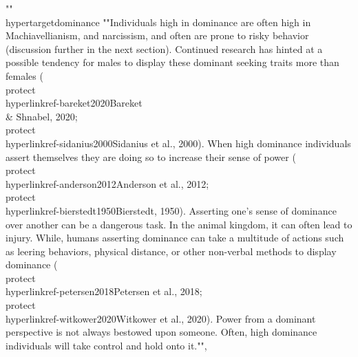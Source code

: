 {{{{""\\hypertarget{dominance}{%
""Individuals high in dominance are often high in Machiavellianism, and narcissism, and often are prone to risky behavior (discussion further in the next section). Continued research has hinted at a possible tendency for males to display these dominant seeking traits more than females (\\protect\\hyperlink{ref-bareket2020}{Bareket \\& Shnabel, 2020}; \\protect\\hyperlink{ref-sidanius2000}{Sidanius et al., 2000}). When high dominance individuals assert themselves they are doing so to increase their sense of power (\\protect\\hyperlink{ref-anderson2012}{Anderson et al., 2012}; \\protect\\hyperlink{ref-bierstedt1950}{Bierstedt, 1950}). Asserting one's sense of dominance over another can be a dangerous task. In the animal kingdom, it can often lead to injury. While, humans asserting dominance can take a multitude of actions such as leering behaviors, physical distance, or other non-verbal methods to display dominance (\\protect\\hyperlink{ref-petersen2018}{Petersen et al., 2018}; \\protect\\hyperlink{ref-witkower2020}{Witkower et al., 2020}). Power from a dominant perspective is not always bestowed upon someone. Often, high dominance individuals will take control and hold onto it."", 
}}}}}
